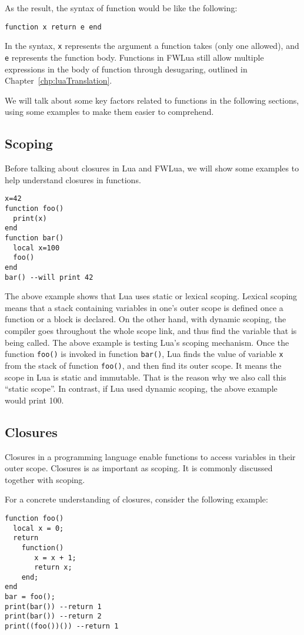 As the result, the syntax of function would be like the following:
\begin{verbatim}
function x return e end
\end{verbatim}
In the syntax, {\tt x} represents the argument a function takes (only one allowed), and {\tt e} represents the function body. Functions in FWLua still allow multiple expressions in the body of function through desugaring, outlined in Chapter~\ref{chp:luaTranslation}.

We will talk about some key factors related to functions in the following sections, using some examples to make them easier to comprehend.

\subsection{Scoping}
Before talking about closures in Lua and FWLua, we will show some examples to help understand closures in functions.
\begin{verbatim}
x=42
function foo()
  print(x)
end
function bar()
  local x=100
  foo()
end
bar() --will print 42
\end{verbatim}
The above example shows that Lua uses static or lexical scoping.
Lexical scoping means that a stack containing variables in one's outer scope is defined once a function or a block is declared.
On the other hand,
with dynamic scoping, the compiler goes throughout the whole scope link, and thus find the variable that is being called.
The above example is testing Lua's scoping mechanism.
Once the function {\tt foo()} is invoked in function {\tt bar()}, Lua finds the value of variable {\tt x} from the stack of function {\tt foo()}, and then find its outer scope.
It means the scope in Lua is static and immutable. That is the reason why we also call this ``static scope''.
In contrast, if Lua used dynamic scoping, the above example would print 100.

\subsection{Closures}
Closures in a programming language enable functions to access variables in their outer scope. Closures is as important as scoping. It is commonly discussed together with scoping.

For a concrete understanding of closures, consider the following example:
\begin{verbatim}
function foo()
  local x = 0;
  return 
    function() 
       x = x + 1;
       return x; 
    end;
end
bar = foo();
print(bar()) --return 1
print(bar()) --return 2
print((foo())()) --return 1
\end{verbatim}

